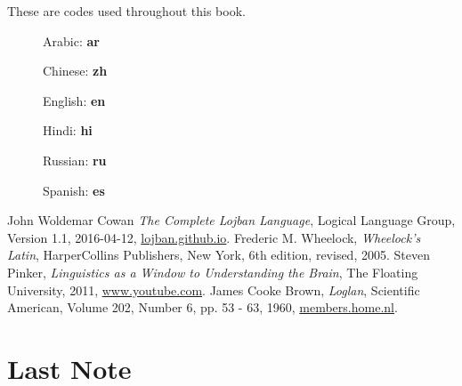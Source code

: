 \documentclass[12pt]{book}
\begin{document}
These are codes used throughout this book.

\begin{description}
\item[ ] Arabic: \textbf{ar}
\item[ ] Chinese: \textbf{zh}
\item[ ] English: \textbf{en}
\item[ ] Hindi: \textbf{hi}
\item[ ] Russian: \textbf{ru}
\item[ ] Spanish: \textbf{es}
\end{description}

\begin{thebibliography}{9}
	John Woldemar Cowan
	\textit{The Complete Lojban Language},
	Logical Language Group,
	Version 1.1,
	2016-04-12,
	\href{https://lojban.github.io/cll/}{lojban.github.io}.
	Frederic M. Wheelock,
	\textit{Wheelock's Latin},
	HarperCollins Publishers, New York,
	6th edition, revised,
	2005.
	Steven Pinker,
	\textit{Linguistics as a Window to Understanding the Brain},
	The Floating University,
	2011,
	\href{https://www.youtube.com/watch?v=Q-B_ONJIEcE}{www.youtube.com}.
	James Cooke Brown,
	\textit{Loglan},
	Scientific American,
	Volume 202, Number 6, pp. 53 - 63,
	1960,
	\href{http://members.home.nl/w.dijkhuis/loglan_jcb/Brown_JC_loglan.html}{members.home.nl}.
\end{thebibliography}

\backmatter 

\chapter{Last Note}
\end{document}
